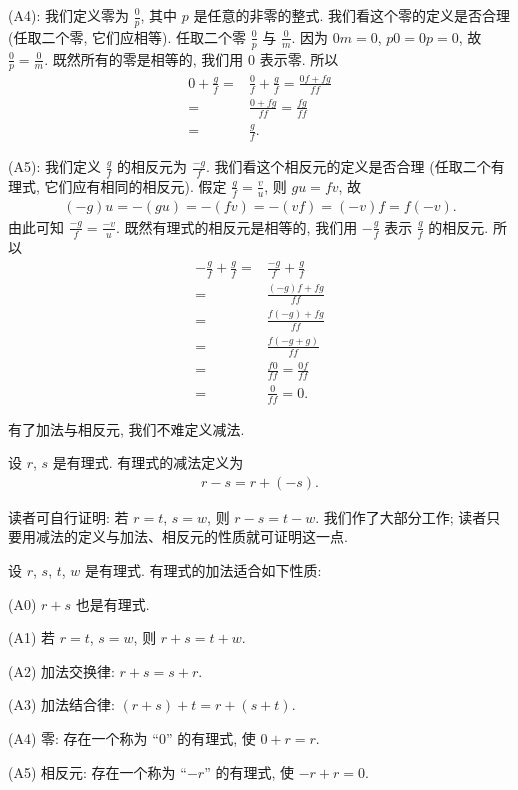 (A4): 我们定义零为 $\frac{0}{p}$, 其中 $p$ 是任意的非零的整式. 我们看这个零的定义是否合理 (任取二个零, 它们应相等). 任取二个零 $\frac{0}{p}$ 与 $\frac{0}{m}$. 因为 $0m = 0$, $p0 = 0p = 0$, 故 $\frac{0}{p} = \frac{0}{m}$. 既然所有的零是相等的, 我们用 $0$ 表示零. 所以
\begin{align*}
    0 + \frac{g}{f}
    = {} & \frac{0}{f} + \frac{g}{f} = \frac{0f + fg}{ff} \\
    = {} & \frac{0 + fg}{ff} = \frac{fg}{ff}              \\
    = {} & \frac{g}{f}.
\end{align*}

(A5): 我们定义 $\frac{g}{f}$ 的相反元为 $\frac{-g}{f}$. 我们看这个相反元的定义是否合理 (任取二个有理式, 它们应有相同的相反元). 假定 $\frac{g}{f} = \frac{v}{u}$, 则 $gu = fv$, 故
\begin{align*}
    (-g)u = -(gu) = -(fv) = -(vf) = (-v)f = f(-v).
\end{align*}
由此可知 $\frac{-g}{f} = \frac{-v}{u}$. 既然有理式的相反元是相等的, 我们用 $-\frac{g}{f}$ 表示 $\frac{g}{f}$ 的相反元. 所以
\begin{align*}
    -\frac{g}{f} + \frac{g}{f}
    = {} & \frac{-g}{f} + \frac{g}{f}    \\
    = {} & \frac{(-g)f + fg}{ff}         \\
    = {} & \frac{f(-g) + fg}{ff}         \\
    = {} & \frac{f(-g + g)}{ff}          \\
    = {} & \frac{f0}{ff} = \frac{0f}{ff} \\
    = {} & \frac{0}{ff} = 0.
\end{align*}

有了加法与相反元, 我们不难定义减法.
\begin{definition}
    设 $r$, $s$ 是有理式. 有理式的减法定义为
    \begin{align*}
        r - s = r + (-s).
    \end{align*}
\end{definition}

读者可自行证明: 若 $r = t$, $s = w$, 则 $r - s = t - w$. 我们作了大部分工作; 读者只要用减法的定义与加法、相反元的性质就可证明这一点.

\begin{proposition}
    设 $r$, $s$, $t$, $w$ 是有理式. 有理式的加法适合如下性质:

    (A0) $r + s$ 也是有理式.

    (A1) 若 $r = t$, $s = w$, 则 $r + s = t + w$.

    (A2) 加法交换律: $r + s = s + r$.

    (A3) 加法结合律: $(r + s) + t = r + (s + t)$.

    (A4) 零: 存在一个称为 ``$0$'' 的有理式, 使 $0 + r = r$.

    (A5) 相反元: 存在一个称为 ``$-r$'' 的有理式, 使 $-r + r = 0$.
\end{proposition}

